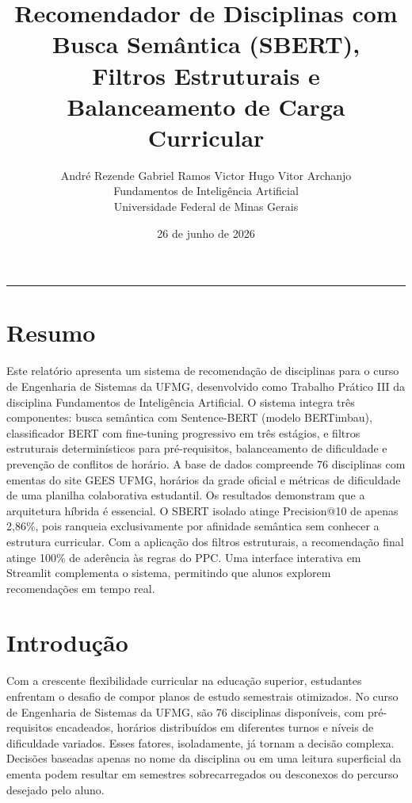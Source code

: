 \documentclass[12pt,a4paper]{article}
\title{\Large \textbf{Recomendador de Disciplinas com Busca Semântica (SBERT),\\Filtros Estruturais e Balanceamento de Carga Curricular}}
\author{
    André Rezende \quad Gabriel Ramos \quad Victor Hugo \quad Vitor Archanjo\\[6pt]
    Fundamentos de Inteligência Artificial\\
    Universidade Federal de Minas Gerais
}
\date{26 de junho de 2026}
\begin{document}
\maketitle

\begin{center}
\rule{0.9\textwidth}{0.4pt}
\end{center}

\section*{Resumo}

Este relatório apresenta um sistema de recomendação de disciplinas para o curso de Engenharia de Sistemas da UFMG, desenvolvido como Trabalho Prático III da disciplina Fundamentos de Inteligência Artificial. O sistema integra três componentes: busca semântica com Sentence-BERT (modelo BERTimbau), classificador BERT com fine-tuning progressivo em três estágios, e filtros estruturais determinísticos para pré-requisitos, balanceamento de dificuldade e prevenção de conflitos de horário. A base de dados compreende 76 disciplinas com ementas do site GEES UFMG, horários da grade oficial e métricas de dificuldade de uma planilha colaborativa estudantil. Os resultados demonstram que a arquitetura híbrida é essencial. O SBERT isolado atinge Precision@10 de apenas 2,86\%, pois ranqueia exclusivamente por afinidade semântica sem conhecer a estrutura curricular. Com a aplicação dos filtros estruturais, a recomendação final atinge 100\% de aderência às regras do PPC. Uma interface interativa em Streamlit complementa o sistema, permitindo que alunos explorem recomendações em tempo real.

\section{Introdução}

Com a crescente flexibilidade curricular na educação superior, estudantes enfrentam o desafio de compor planos de estudo semestrais otimizados. No curso de Engenharia de Sistemas da UFMG, são 76 disciplinas disponíveis, com pré-requisitos encadeados, horários distribuídos em diferentes turnos e níveis de dificuldade variados. Esses fatores, isoladamente, já tornam a decisão complexa. Decisões baseadas apenas no nome da disciplina ou em uma leitura superficial da ementa podem resultar em semestres sobrecarregados ou desconexos do percurso desejado pelo aluno.
\end{document}
